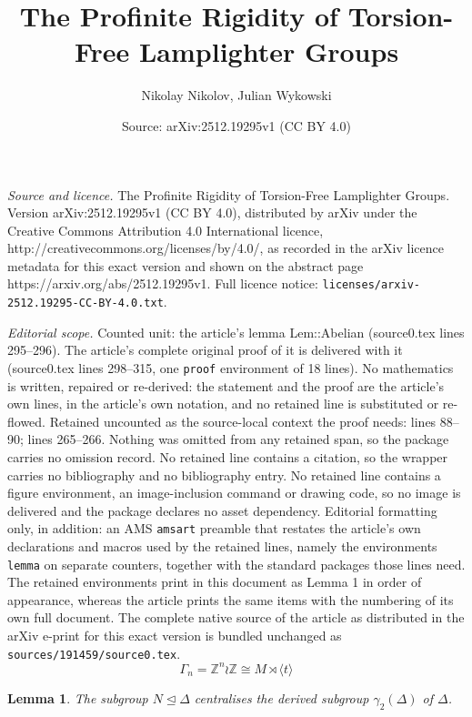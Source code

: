 \documentclass[10pt,a4paper]{amsart}
\title{The Profinite Rigidity of Torsion-Free Lamplighter Groups}
\author{Nikolay Nikolov, Julian Wykowski}
\date{Source: arXiv:2512.19295v1 (CC BY 4.0)}
\newtheorem{lemma}{Lemma}
\newcommand{\Z}{\mathbb{Z}}
\begin{document}
\maketitle

\noindent\emph{Source and licence.} The Profinite Rigidity of Torsion-Free Lamplighter Groups. Version arXiv:2512.19295v1 (CC BY 4.0), distributed by arXiv under the Creative Commons Attribution 4.0 International licence, http://creativecommons.org/licenses/by/4.0/, as recorded in the arXiv licence metadata for this exact version and shown on the abstract page https://arxiv.org/abs/2512.19295v1. Full licence notice: \texttt{licenses/arxiv-2512.19295-CC-BY-4.0.txt}.\par\smallskip

\noindent\textit{Editorial scope.} Counted unit: the article's lemma Lem::Abelian (source0.tex lines 295--296). The article's complete original proof of it is delivered with it (source0.tex lines 298--315, one \texttt{proof} environment of 18 lines). No mathematics is written, repaired or re-derived: the statement and the proof are the article's own lines, in the article's own notation, and no retained line is substituted or re-flowed.  Retained uncounted as the source-local context the proof needs: lines 88--90; lines 265--266.  Nothing was omitted from any retained span, so the package carries no omission record.  No retained line contains a citation, so the wrapper carries no bibliography and no bibliography entry.  No retained line contains a figure environment, an image-inclusion command or drawing code, so no image is delivered and the package declares no asset dependency.  Editorial formatting only, in addition: an AMS \texttt{amsart} preamble that restates the article's own declarations and macros used by the retained lines, namely the environments \texttt{lemma} on separate counters, together with the standard packages those lines need.  The retained environments print in this document as Lemma 1 in order of appearance, whereas the article prints the same items with the numbering of its own full document.  The complete native source of the article as distributed in the arXiv e-print for this exact version is bundled unchanged as \texttt{sources/191459/source0.tex}.
\begin{equation} \label{Eq::DefOfLL}
\Gamma_n = \Z^n \wr \Z \cong M \rtimes \langle t\rangle
\end{equation}

\begin{lemma} \label{centralizer} The subgroup $N \trianglelefteq \Delta$ centralises the derived subgroup $\gamma_2(\Delta)$ of $\Delta$.
\end{lemma}
\end{document}
